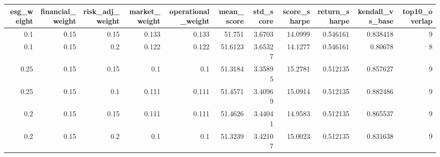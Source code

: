 \begin{tabular}{rrrrrrrrrrr}
\toprule
esg_weight & financial_weight & risk_adj_weight & market_weight & operational_weight & mean_score & std_score & score_sharpe & return_sharpe & kendall_vs_base & top10_overlap \\
\midrule
0.1 & 0.15 & 0.15 & 0.133 & 0.133 & 51.751 & 3.6703 & 14.0999 & 0.546161 & 0.838418 & 9 \\
0.1 & 0.15 & 0.2 & 0.122 & 0.122 & 51.6123 & 3.65327 & 14.1277 & 0.546161 & 0.80678 & 8 \\
0.25 & 0.15 & 0.15 & 0.1 & 0.1 & 51.3184 & 3.35895 & 15.2781 & 0.512135 & 0.857627 & 9 \\
0.25 & 0.15 & 0.1 & 0.111 & 0.111 & 51.4571 & 3.40969 & 15.0914 & 0.512135 & 0.882486 & 9 \\
0.2 & 0.15 & 0.15 & 0.111 & 0.111 & 51.4626 & 3.44041 & 14.9583 & 0.512135 & 0.865537 & 9 \\
0.2 & 0.15 & 0.2 & 0.1 & 0.1 & 51.3239 & 3.42107 & 15.0023 & 0.512135 & 0.831638 & 9 \\
\bottomrule
\end{tabular}
